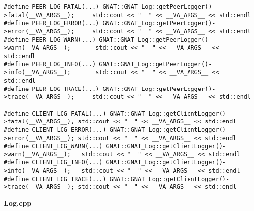\begin{lstlisting}
#define PEER_LOG_FATAL(...) GNAT::GNAT_Log::getPeerLogger()->fatal(__VA_ARGS__);	 std::cout << "  " << __VA_ARGS__ << std::endl
#define PEER_LOG_ERROR(...) GNAT::GNAT_Log::getPeerLogger()->error(__VA_ARGS__);	 std::cout << "  " << __VA_ARGS__ << std::endl
#define PEER_LOG_WARN(...) GNAT::GNAT_Log::getPeerLogger()->warn(__VA_ARGS__);		 std::cout << "  " << __VA_ARGS__ << std::endl
#define PEER_LOG_INFO(...) GNAT::GNAT_Log::getPeerLogger()->info(__VA_ARGS__);		 std::cout << "  " << __VA_ARGS__ << std::endl
#define PEER_LOG_TRACE(...) GNAT::GNAT_Log::getPeerLogger()->trace(__VA_ARGS__);	 std::cout << "  " << __VA_ARGS__ << std::endl

#define CLIENT_LOG_FATAL(...) GNAT::GNAT_Log::getClientLogger()->fatal(__VA_ARGS__); std::cout << "  " << __VA_ARGS__ << std::endl
#define CLIENT_LOG_ERROR(...) GNAT::GNAT_Log::getClientLogger()->error(__VA_ARGS__); std::cout << "  " << __VA_ARGS__ << std::endl
#define CLIENT_LOG_WARN(...) GNAT::GNAT_Log::getClientLogger()->warn(__VA_ARGS__);	 std::cout << "  " << __VA_ARGS__ << std::endl
#define CLIENT_LOG_INFO(...) GNAT::GNAT_Log::getClientLogger()->info(__VA_ARGS__);	 std::cout << "  " << __VA_ARGS__ << std::endl
#define CLIENT_LOG_TRACE(...) GNAT::GNAT_Log::getClientLogger()->trace(__VA_ARGS__); std::cout << "  " << __VA_ARGS__ << std::endl
\end{lstlisting}

\textbf{Log.cpp}

